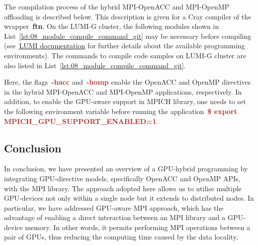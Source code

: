 \par
The compilation process of the hybrid MPI-OpenACC and MPI-OpenMP offloading is described below.
This description is given for a Cray compiler of the wrapper~\textbf{ftn}.
On the LUMI-G cluster, the following modules shown in List~\ref{lst:08_module_compile_command_git} may be necessary before compiling (see~\href{https://docs.lumi-supercomputer.eu/development/compiling/prgenv/}{LUMI documentation} for further details about the available programming environments).
The commands to compile code samples on LUMI-G cluster are also listed in List~\ref{lst:08_module_compile_command_git}.





\par
Here, the flags~\textbf{\textcolor{brown}{-hacc}} and~\textbf{\textcolor{brown}{-homp}} enable the OpenACC and OpenMP directives in the hybrid MPI-OpenACC and MPI-OpenMP applications, respectively.
In addition, to enable the GPU-aware support in MPICH library, one needs to set the following environment variable before running the application~\textbf{\textcolor{brown}{\$ export MPICH\_GPU\_SUPPORT\_ENABLED=1}}.




\subsection{Conclusion}


\par
In conclusion, we have presented an overview of a GPU-hybrid programming by integrating GPU-directive models, specifically OpenACC and OpenMP APIs, with the MPI library.
The approach adopted here allows us to utilise multiple GPU-devices not only within a single node but it extends to distributed nodes.
In particular, we have addressed GPU-aware MPI approach, which has the advantage of enabling a direct interaction between an MPI library and a GPU-device memory.
In other words, it permits performing MPI operations between a pair of GPUs, thus reducing the computing time caused by the data locality.


